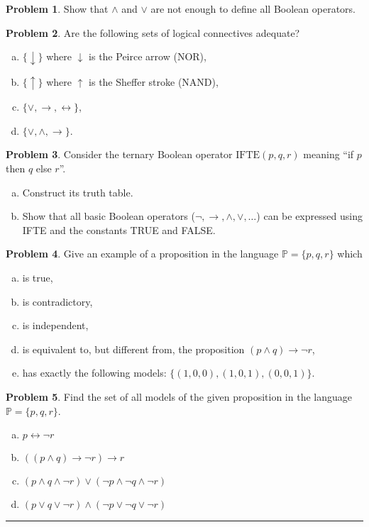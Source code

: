 \documentclass{amsart}
\theoremstyle{definition}
\newtheorem{problem}{Problem}
\begin{document}
\smallskip
\begin{problem}
Show that $\wedge$ and $\vee$ are not enough to define all Boolean operators.
\end{problem}

\begin{problem} Are the following sets of logical connectives adequate? 
\begin{enumerate}[(a)]
    \item $\{\downarrow\}$ where $\downarrow$ is the Peirce arrow (NOR),
    \item $\{\uparrow\}$ where $\uparrow$ is the Sheffer stroke (NAND),
    \item $\{\vee, \rightarrow, \leftrightarrow\}$,
    \item $\{\vee, \wedge, \rightarrow\}$.
\end{enumerate}
\end{problem}

\smallskip
\begin{problem}
Consider the ternary Boolean operator $\mathrm{IFTE}(p, q, r)$ meaning ``if $p$ then $q$ else $r$''. 
\begin{enumerate}[(a)]
    \item Construct its truth table.
    \item Show that all basic Boolean operators ($\neg, \to, \wedge,\vee,\dots$) can be expressed using IFTE and the constants TRUE and FALSE.
\end{enumerate}  
\end{problem}



\begin{problem}
Give an example of a proposition in the language $\mathbb P=\{p,q,r\}$ which
\begin{enumerate}[(a)]
\item is true,
\item is contradictory,
\item is independent,
\item is equivalent to, but different from, the proposition $(p\wedge q)\to\neg r$,
\item has exactly the following models: $\{(1,0,0),(1,0,1),(0,0,1)\}$.
\end{enumerate}
\end{problem}


\begin{problem}
Find the set of all models of the given proposition in the language $\mathbb P=\{p,q,r\}$.
\begin{enumerate}[(a)]
    \item $p\leftrightarrow \neg r$
    \item $((p\wedge q)\to\neg r)\to r$
    \item $(p\wedge q\wedge \neg r)\vee (\neg p\wedge \neg q\wedge \neg r)$
    \item $(p\vee q\vee \neg r)\wedge (\neg p\vee \neg q\vee \neg r)$
    
\end{enumerate}


\end{problem}

\medskip\hrule\medskip
\end{document}
